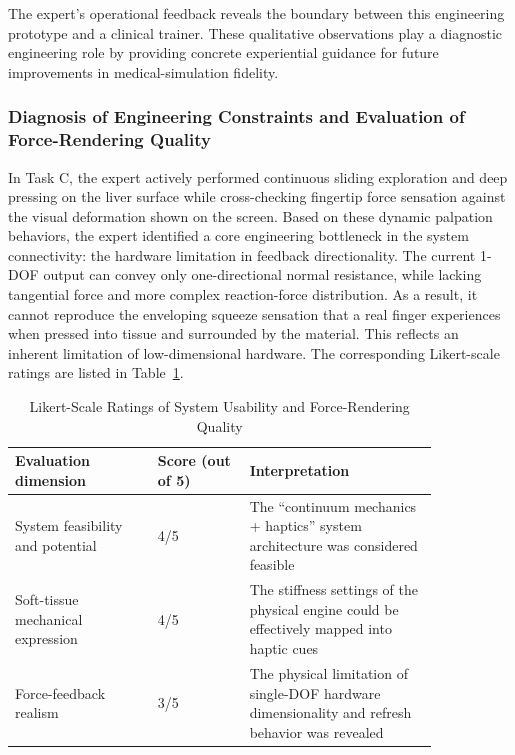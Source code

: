 \documentclass{ieeeaccess}
\begin{document}
The expert's operational feedback reveals the boundary between this engineering prototype and a clinical trainer. These qualitative observations play a diagnostic engineering role by providing concrete experiential guidance for future improvements in medical-simulation fidelity.

\subsubsection{Diagnosis of Engineering Constraints and Evaluation of Force-Rendering Quality}
In Task C, the expert actively performed continuous sliding exploration and deep pressing on the liver surface while cross-checking fingertip force sensation against the visual deformation shown on the screen. Based on these dynamic palpation behaviors, the expert identified a core engineering bottleneck in the system connectivity: the hardware limitation in feedback directionality. The current 1-DOF output can convey only one-directional normal resistance, while lacking tangential force and more complex reaction-force distribution. As a result, it cannot reproduce the enveloping squeeze sensation that a real finger experiences when pressed into tissue and surrounded by the material. This reflects an inherent limitation of low-dimensional hardware. The corresponding Likert-scale ratings are listed in Table~\ref{tab:likert}.

\begin{table}[htbp]
\caption{Likert-Scale Ratings of System Usability and Force-Rendering Quality}
\label{tab:likert}
\centering
\footnotesize
\renewcommand{\arraystretch}{1.15}
\begin{tabular}{|p{0.29\linewidth}|p{0.18\linewidth}|p{0.37\linewidth}|}
\hline
Evaluation dimension & Score (out of 5) & Interpretation \\
\hline
System feasibility and potential & 4/5 & The ``continuum mechanics + haptics'' system architecture was considered feasible \\
\hline
Soft-tissue mechanical expression & 4/5 & The stiffness settings of the physical engine could be effectively mapped into haptic cues \\
\hline
Force-feedback realism & 3/5 & The physical limitation of single-DOF hardware dimensionality and refresh behavior was revealed \\
\hline
\end{tabular}
\end{table}
\end{document}
